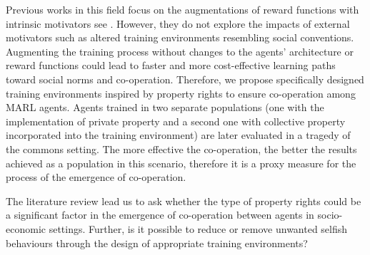\documentclass[preprint,12pt,authoryear]{elsarticle}
\begin{document}
Previous works in this field focus on the augmentations of reward functions with intrinsic motivators see \citep{Peysakhovich2017, Perolat2017, Hughes2018, Willis2023a, Willis2023b}. However, they do not explore the impacts of external motivators such as altered training environments resembling social conventions. Augmenting the training process without changes to the agents’ architecture or reward functions could lead to faster and more cost-effective learning paths toward social norms and co-operation. Therefore, we propose specifically designed training environments inspired by property rights to ensure co-operation among MARL agents. Agents trained in two separate populations (one with the implementation of private property and a second one with collective property incorporated into the training environment) are later evaluated in a tragedy of the commons setting. The more effective the co-operation, the better the results achieved as a population in this scenario, therefore it is a proxy measure for the process of the emergence of co-operation.
 
The literature review lead us to ask whether the type of property rights could be a significant factor in the emergence of co-operation between agents in socio-economic settings. Further, is it possible to reduce or remove unwanted selfish behaviours through the design of appropriate training environments? 


\end{document}
